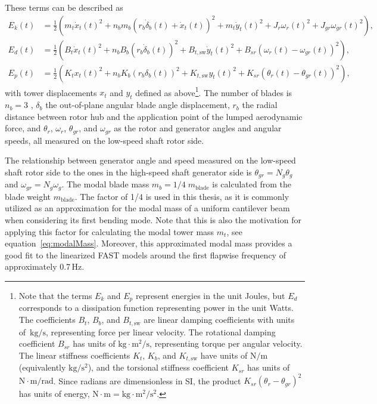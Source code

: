 %
These terms can be described as
\begin{align*}
    E_k(t) & = \frac{1}{2}\left(m_t\dot{x}_t(t)^2 + n_b m_b(r_b\dot{\delta}_b(t) + \dot{x}_t(t))^2 + m_t\dot{y}_t(t)^2 + J_r\omega_r(t)^2 + J_{gr}\omega_{gr}(t)^2\right),\\
    E_d(t)  & = \frac{1}{2}\left(B_t\dot{x}_t(t)^2 + n_b B_b(r_b\dot{\delta}_b(t))^2 + B_{t,\text{sw}}\dot{y}_t(t)^2 + B_{sr}(\omega_r(t) - \omega_{gr}(t))^2\right),\\
    E_p(t)  & = \frac{1}{2}\left(K_t{x}_t(t)^2 + n_b K_b(r_b{\delta}_b(t))^2 + K_{t,\text{sw}}{y}_t(t)^2 + K_{sr}(\theta_r(t) - \theta_{gr}(t))^2\right),
\end{align*}
with tower displacements \(x_t\) and \(y_t\) defined as above\footnote{Note that the terms \(E_k\) and \(E_p\) represent energies in the unit Joules, but \(E_d\) corresponds to a dissipation function representing power in the unit Watts. The coefficients \(B_t\), \(B_b\), and \(B_{t,\text{sw}}\) are linear damping coefficients with units of~\(\text{kg}/\text{s}\), representing force per linear velocity. The rotational damping coefficient \(B_{sr}\) has units of \(\text{kg}\cdot \text{m}^2/\text{s}\), representing torque per angular velocity. The linear stiffness coefficients \(K_t\), \(K_b\), and \(K_{t,\text{sw}}\) have units of \(\text{N}/\text{m}\) (equivalently \(\text{kg}/\text{s}^2\)), and the torsional stiffness coefficient \(K_{sr}\) has units of \(\text{N}\cdot\text{m}/\text{rad}\). Since radians are dimensionless in SI, the product \(K_{sr}(\theta_r - \theta_{gr})^2\) has units of energy, \( \text{N}\cdot\text{m} =\text{kg} \cdot \text{m}^2 / \text{s}^2\).}. The number of blades is $n_b=3$ , \(\delta_b\) the out-of-plane angular blade angle displacement, $r_b$ the radial distance between rotor hub and the application point of the lumped aerodynamic force, and \(\theta_r\), \(\omega_r\), \(\theta_{gr}\), and \(\omega_{gr}\) as the rotor and generator angles and angular speeds, all measured on the low-speed shaft rotor side. 
 
The relationship between generator angle and speed measured on the low-speed shaft rotor side to the ones in the high-speed shaft generator side is $\theta_{gr} = N_g \theta_{g}$ and  $\omega_{gr} = N_g \omega_{g}$. The modal blade mass $m_b = 1/4\; m_{\text{blade}}$ is calculated from the blade weight $m_{\text{blade}}$. The factor of 1/4 is used in this thesis, as it is commonly utilized as an approximation for the modal mass of a uniform cantilever beam when considering its first bending mode. Note that this is also the motivation for applying this factor for calculating the modal tower mass $m_t$, see equation~\eqref{eq:modalMass}. Moreover, this approximated modal mass provides a good fit to the linearized FAST models around the first flapwise frequency of approximately 0.7\,Hz. 

